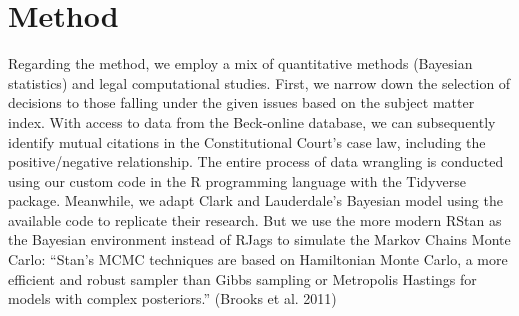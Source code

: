 \documentclass[
  11pt,
]{article}
\begin{document}
\hypertarget{method}{%
\section{Method}\label{method}}

Regarding the method, we employ a mix of quantitative methods (Bayesian
statistics) and legal computational studies. First, we narrow down the
selection of decisions to those falling under the given issues based on
the subject matter index. With access to data from the Beck-online
database, we can subsequently identify mutual citations in the
Constitutional Court's case law, including the positive/negative
relationship. The entire process of data wrangling is conducted using
our custom code in the R programming language with the Tidyverse
package. Meanwhile, we adapt Clark and Lauderdale's Bayesian model using
the available code to replicate their research. But we use the more
modern RStan as the Bayesian environment instead of RJags to simulate
the Markov Chains Monte Carlo: ``Stan's MCMC techniques are based on
Hamiltonian Monte Carlo, a more efficient and robust sampler than Gibbs
sampling or Metropolis Hastings for models with complex posteriors.''
(Brooks et al. 2011)
\end{document}
